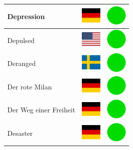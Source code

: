 \documentclass[12pt, a4paper, twoside]{report}
\begin{document}
\begin{center}
\begin{longtable}{|p{5cm}|p{2cm}|p{2cm}|}
 Depression                                                 & \includegraphics[width=1cm]{../img/flags/de} &   \includegraphics[width=1cm]{../likes/y} \\ \hline
 Depulsed                                                   & \includegraphics[width=1cm]{../img/flags/us} &   \includegraphics[width=1cm]{../likes/y} \\ \hline
 Deranged                                                   & \includegraphics[width=1cm]{../img/flags/se} &   \includegraphics[width=1cm]{../likes/y} \\ \hline
 Der rote Milan                                             & \includegraphics[width=1cm]{../img/flags/de} &   \includegraphics[width=1cm]{../likes/y} \\ \hline
 Der Weg einer Freiheit                                     & \includegraphics[width=1cm]{../img/flags/de} &   \includegraphics[width=1cm]{../likes/y} \\ \hline
 Desaster                                                   & \includegraphics[width=1cm]{../img/flags/de} &   \includegraphics[width=1cm]{../likes/y} \\ \hline

\end{longtable}
\end{center}
\end{document}

